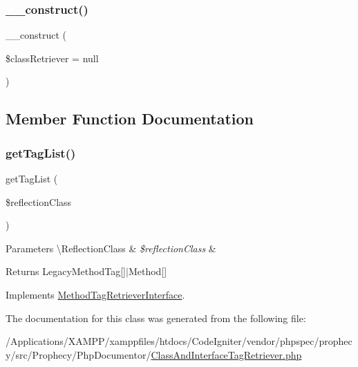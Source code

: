 \subsubsection{\texorpdfstring{\+\_\+\+\_\+construct()}{\_\_construct()}}
{\footnotesize\ttfamily \+\_\+\+\_\+construct (\begin{DoxyParamCaption}\item[{\mbox{\hyperlink{interface_prophecy_1_1_php_documentor_1_1_method_tag_retriever_interface}{Method\+Tag\+Retriever\+Interface}}}]{\$class\+Retriever = {\ttfamily null} }\end{DoxyParamCaption})}



\subsection{Member Function Documentation}
\mbox{\label{class_prophecy_1_1_php_documentor_1_1_class_and_interface_tag_retriever_a2eb68ce00dcc84a156b9a2b7844a5e6f}} 
\subsubsection{\texorpdfstring{get\+Tag\+List()}{getTagList()}}
{\footnotesize\ttfamily get\+Tag\+List (\begin{DoxyParamCaption}\item[{\textbackslash{}Reflection\+Class}]{\$reflection\+Class }\end{DoxyParamCaption})}


\begin{DoxyParams}[1]{Parameters}
\textbackslash{}\+Reflection\+Class & {\em \$reflection\+Class} & \\
\hline
\end{DoxyParams}
\begin{DoxyReturn}{Returns}
Legacy\+Method\+Tag\mbox{[}\mbox{]}$\vert$\+Method\mbox{[}\mbox{]} 
\end{DoxyReturn}


Implements \mbox{\hyperlink{interface_prophecy_1_1_php_documentor_1_1_method_tag_retriever_interface_a2eb68ce00dcc84a156b9a2b7844a5e6f}{Method\+Tag\+Retriever\+Interface}}.



The documentation for this class was generated from the following file\+:\begin{DoxyCompactItemize}
\item 
/\+Applications/\+X\+A\+M\+P\+P/xamppfiles/htdocs/\+Code\+Igniter/vendor/phpspec/prophecy/src/\+Prophecy/\+Php\+Documentor/\mbox{\hyperlink{_class_and_interface_tag_retriever_8php}{Class\+And\+Interface\+Tag\+Retriever.\+php}}\end{DoxyCompactItemize}
